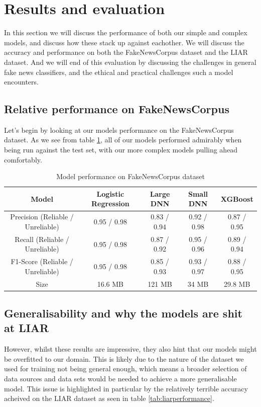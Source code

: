 \section{Results and evaluation}
In this section we will discuss the performance of both our simple and complex models, and discuss how these stack up
against eachother. We will discuss the accuracy and performance on both the FakeNewsCorpus dataset and the LIAR
dataset. And we will end of this evaluation by discussing the challenges in general fake news classifiers, and the
ethical and practical challenges such a model encounters.

\subsection{Relative performance on FakeNewsCorpus}
Let's begin by looking at our models performance on the FakeNewsCorpus dataset. As we see from table \ref{tab:fakenewsperformance},
all of our models performed admirably when being run against the test set, with our more complex models pulling ahead
comfortably.

\begin{table}[htpb]
  \centering
  \caption{Model performance on FakeNewsCorpus dataset}
  \label{tab:fakenewsperformance}

  \begin{tabular}{c|cccc}
    Model & Logistic Regression & Large DNN & Small DNN & XGBoost \\ \hline
    Precision (Reliable / Unreliable) & 0.95 / 0.98 & 0.83 / 0.94 & 0.92 / 0.98 & 0.87 / 0.95 \\ \hline
    Recall (Reliable / Unreliable) & 0.95 / 0.98 & 0.87 / 0.92 & 0.95 / 0.96 & 0.89 / 0.94 \\ \hline
    F1-Score (Reliable / Unreliable) & 0.95 / 0.98 & 0.85 / 0.93 & 0.93 / 0.97 & 0.88 / 0.95 \\ \hline
    Size & 16.6 MB & 121 MB & 34 MB & 29.8 MB 
  \end{tabular}
\end{table}

\subsection{Generalisability and why the models are shit at LIAR}
However, whilst these results are impressive, they also hint that our models might be overfitted to our domain. This is
likely due to the nature of the dataset we used for training not being general enough, which means a broader selection
of data sources and data sets would be needed to achieve a more generalisable model. This issue is highlighted in
particular by the relatively terrible accuracy acheived on the LIAR dataset as seen in table \ref{tab:liarperformance}.


